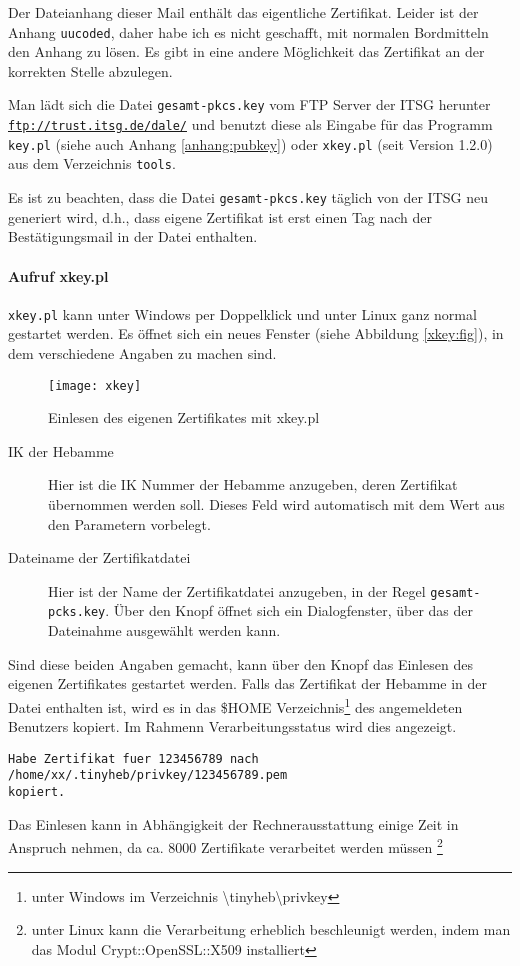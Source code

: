 Der Dateianhang dieser Mail enthält das eigentliche Zertifikat. Leider 
ist der Anhang \verb|uucoded|, daher habe ich es nicht geschafft, mit
normalen Bordmitteln den Anhang zu lösen. Es gibt in \tinyHeb\/
eine andere Möglichkeit das Zertifikat an der korrekten Stelle abzulegen.

Man lädt sich die Datei \verb|gesamt-pkcs.key| vom FTP Server der ITSG
herunter
{\href{ftp://trust.itsg.de/dale/}{\nolinkurl{ftp://trust.itsg.de/dale/}}}
und benutzt diese als Eingabe für das Programm \verb|key.pl| 
(siehe auch Anhang \vref{anhang:pubkey}) oder 
\verb|xkey.pl| (seit \tinyHeb\/ Version 1.2.0) aus dem
Verzeichnis \verb|tools|. 

Es ist zu beachten, dass die Datei
\verb|gesamt-pkcs.key| täglich von der ITSG neu generiert wird, d.h.,
dass eigene Zertifikat ist erst einen Tag nach der Bestätigungsmail in
der Datei enthalten.

\paragraph{Aufruf xkey.pl}
\verb|xkey.pl| kann unter Windows per Doppelklick und unter Linux ganz
normal gestartet werden. Es öffnet sich ein neues Fenster (siehe 
Abbildung \vref{xkey:fig}), in dem verschiedene Angaben zu machen sind.

\begin{figure}[H]
\centering
\texttt{[image: xkey]}
\caption{\tinyHeb\/ Einlesen des eigenen Zertifikates mit xkey.pl\label{xkey:fig}}
\end{figure}

\begin{description}
\item[IK der Hebamme]
Hier ist die IK Nummer der Hebamme anzugeben, deren Zertifikat übernommen
werden soll. Dieses Feld wird automatisch mit dem Wert aus den Parametern
vorbelegt.
\item[Dateiname der Zertifikatdatei]
Hier ist der Name der Zertifikatdatei anzugeben, in der Regel 
\verb|gesamt-pcks.key|. Über den Knopf  öffnet sich ein
Dialogfenster, über das der Dateinahme ausgewählt werden kann.
\end{description}

Sind diese beiden Angaben gemacht, kann über den Knopf 
 das Einlesen des eigenen Zertifikates
gestartet werden.
Falls das Zertifikat der Hebamme in der Datei enthalten ist, wird es
in das \$HOME Verzeichnis\footnote{unter Windows im Verzeichnis \textbackslash tinyheb\textbackslash privkey} des angemeldeten Benutzers kopiert.
Im Rahmenn Verarbeitungsstatus wird dies angezeigt.
\begin{verbatim}
Habe Zertifikat fuer 123456789 nach /home/xx/.tinyheb/privkey/123456789.pem 
kopiert.
\end{verbatim}
Das Einlesen kann in Abhängigkeit der Rechnerausstattung einige Zeit 
in Anspruch nehmen, da ca. 8000 Zertifikate verarbeitet werden müssen
\footnote{unter Linux kann die Verarbeitung erheblich beschleunigt werden,
indem man das Modul Crypt::OpenSSL::X509 installiert}

